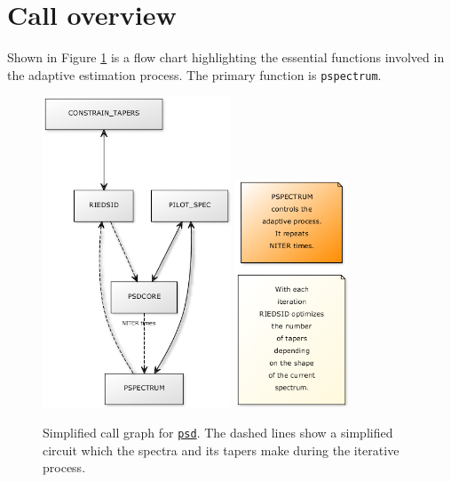 \documentclass{article}\usepackage{graphicx, color}
\newcommand{\Rcmd}[1]{\texttt{#1}}
\newcommand{\psd}[0]{\href{http://abarbour.github.com/psd/}{\color{blue}\Rcmd{psd}}}
\begin{document}

\section{Call overview}

Shown
in Figure \ref{fig:calls}
is a flow chart 
highlighting the essential
functions involved in the adaptive estimation
process. The primary function is \Rcmd{pspectrum}.

\begin{figure}[htb!]
 \centering
 \includegraphics[width=0.5\textwidth]{yuml_d.png}%
 \includegraphics[width=0.3\textwidth]{yuml_n.png}
 \caption{Simplified call graph for \psd{}. The dashed lines show a
 simplified circuit
 which the spectra and its tapers make during the iterative process.}
 \label{fig:calls}
\end{figure}
\end{document}
